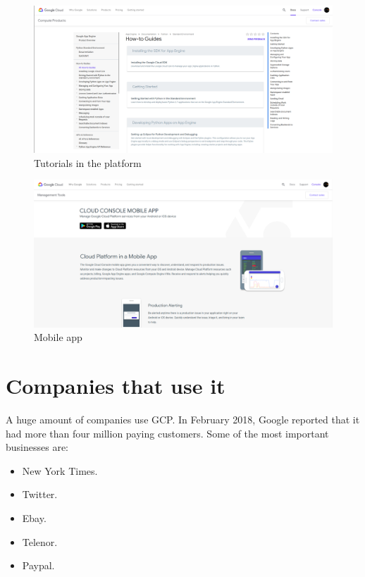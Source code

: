 \documentclass[12pt,english]{article}
\begin{document}
\begin{figure}[H]
  \centering
  \includegraphics[scale = 0.35]{tutorials.png}
  \caption{Tutorials in the platform}
\end{figure}

\begin{figure}[H]
  \centering
  \includegraphics[scale = 0.35]{app.png}
  \caption{Mobile app}
\end{figure}

\newpage

\section{Companies that use it}

A huge amount of companies use GCP. In February 2018, Google reported that it had more than four million paying customers. Some of the most important businesses are:
\begin{itemize}
 \item New York Times.
 \item Twitter.
 \item Ebay.
 \item Telenor.
 \item Paypal.
\end{itemize}
\end{document}
